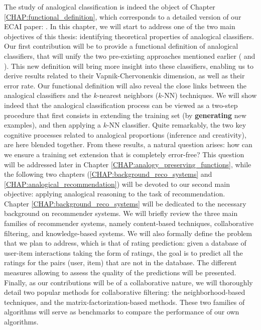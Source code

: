 The study of analogical classification is indeed the object of Chapter
\ref{CHAP:functional_definition}, which corresponds to a detailed version of our
ECAI paper: \cite{HugPraRicSerECAI16}. In this chapter, we will start to
address one of the two main objectives of this thesis: identifying theoretical
properties of analogical classifiers. Our first contribution will be to provide
a functional definition of analogical classifiers, that will unify the two
pre-existing approaches mentioned earlier (\cite{StrYvoCNLL05} and
\cite{BayMicDelIJCAI07}). This new definition will bring more
insight into these classifiers, enabling us to derive results related to their
Vapnik-Chervonenkis dimension, as well as their error rate. Our functional
definition will also
reveal the close links between the analogical classifiers and the $k$-nearest
neighbors ($k$-NN) techniques. We will show indeed that the analogical
classification process can be viewed as a two-step procedure that first
consists in extending the training
set (by \textbf{generating} new examples), and then applying a $k$-NN
classifier. Quite remarkably, the two key cognitive processes related to
analogical proportions (inference and creativity),
are here blended together. From these results, a natural question arises: how
can we ensure a training set extension that is completely error-free? This
question will be addressed later in Chapter
\ref{CHAP:analogy_preserving_functions}, while the  following two chapters
(\ref{CHAP:background_reco_systems} and \ref{CHAP:analogical_recommendation})
will be devoted to our second main objective: applying analogical reasoning to
the task of recommendation.\\

Chapter \ref{CHAP:background_reco_systems} will be dedicated to the necessary
background on recommender systems. We will briefly review the three main
families of recommender systems, namely content-based techniques, collaborative
filtering, and knowledge-based systems. We will also formally define the
problem that we plan to address, which is that of rating prediction: given a
database of  user-item interactions taking the form of ratings, the goal is to
predict all the ratings for the pairs (user, item) that are not in the
database. The different measures allowing to assess the quality of the
predictions will be presented. Finally, as our contributions will be of a
collaborative nature, we will thoroughly detail two popular methods for
collaborative filtering: the neighborhood-based techniques, and the
matrix-factorization-based methods. These two families of algorithms will serve
as benchmarks to compare the performance of our own algorithms.\\

